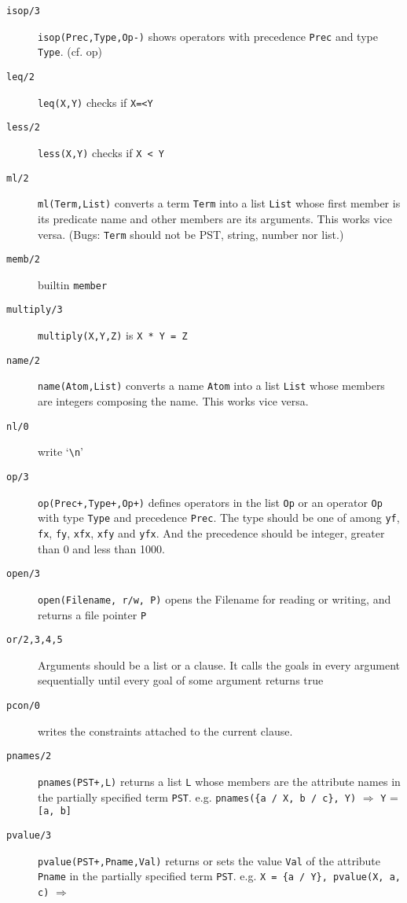 \begin{description}
 \item [{\tt isop/3}]  {\tt isop(Prec,Type,Op-)} shows operators with
precedence {\tt Prec} and type {\tt Type}. (cf. op)
 \item [{\tt leq/2}] {\tt leq(X,Y)} checks if {\tt X=<Y}
 \item [{\tt less/2}]  {\tt less(X,Y)} checks if {\tt X < Y}
 \item [{\tt ml/2}]
	 {\tt ml(Term,List)} converts a term {\tt Term} into
         a list {\tt List} whose first member is its predicate name
         and other members are its arguments. This works vice versa.
(Bugs: {\tt Term} should not be PST, string, number nor list.)
 \item [{\tt memb/2}] builtin {\tt member}
 \item [{\tt multiply/3}]  {\tt multiply(X,Y,Z)} is \verb$X * Y = Z$
 \item [{\tt name/2}]
	{\tt name(Atom,List)} converts a name {\tt Atom} into
         a list {\tt List} whose members are integers composing the name.
        This works vice versa.
 \item [{\tt nl/0}] write `\verb+\n+' 
 \item [{\tt op/3}]  {\tt op(Prec+,Type+,Op+)} defines operators in the
	list {\tt Op} or an operator {\tt Op} with  type {\tt Type} and
	precedence {\tt Prec}. The type should be one of among 
        {\tt yf}, {\tt fx}, {\tt fy}, {\tt xfx}, {\tt xfy} and {\tt yfx}.
     And the precedence should be integer, greater than 0 and less than 1000.
 \item [{\tt open/3}] {\tt open(Filename, r/w, P)} opens
  the Filename for reading or writing, and returns a file pointer {\tt P} 
 \item [{\tt or/2,3,4,5}] Arguments should be a list or a clause. It
	calls the goals in every argument sequentially until every goal of some
	argument returns true 
 \item [{\tt pcon/0}]  writes the constraints attached to the current
	clause.
 \item [{\tt pnames/2}]  {\tt pnames(PST+,L)} returns a list {\tt L}
	whose members are the attribute names in the partially specified term
	{\tt PST}. e.g. {\tt pnames(\{a / X, b / c\}, Y)} $\Rightarrow$
        {\tt Y} = {\tt [a, b]}
 \item [{\tt pvalue/3}]
	{\tt pvalue(PST+,Pname,Val)} returns or sets the value {\tt Val}
        of the  attribute {\tt Pname} in the partially specified term 
        {\tt PST}. e.g. {\tt X = \{a / Y\}, pvalue(X, a, c)} $\Rightarrow$

\end{description}
